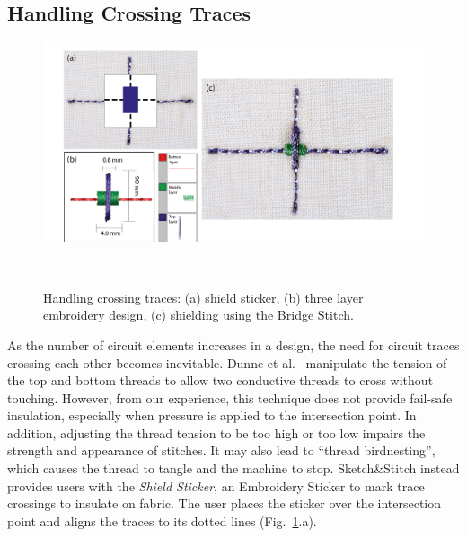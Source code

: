 \documentclass[header.tex]{subfiles}
\begin{document}
\subsection{Handling Crossing Traces}
\begin{figure}
\centering
  \includegraphics[width=1\columnwidth]{figures/BridgeStitch}
  \caption{Handling crossing traces: (a) shield sticker, (b) three layer embroidery design, (c) shielding using the Bridge Stitch.}~\label{fig:BridgeStitch}
  \vspace{-2.5em}
\end{figure}
As the number of circuit elements increases in a design, the need for circuit traces crossing each other becomes inevitable. Dunne et al.\ \cite{Dunne:2012:MEC:2370216.2370348} manipulate the tension of the top and bottom threads to allow two conductive threads to cross without touching. However, from our experience, this technique does not provide fail-safe insulation, especially when pressure is applied to the intersection point. In addition, adjusting the thread tension to be too high or too low impairs the strength and appearance of stitches. It may also lead to ``thread birdnesting'', which causes the thread to tangle and the machine to stop.  
Sketch\&Stitch instead provides users with the \textit{Shield Sticker}, an Embroidery Sticker to mark trace crossings to insulate on fabric. The user places the sticker over the intersection point and aligns the traces to its dotted lines (Fig.\ \ref{fig:BridgeStitch}.a). 
\end{document}
